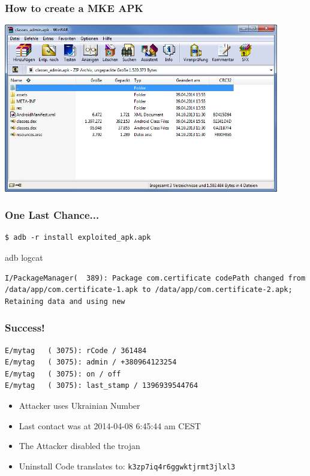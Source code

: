 \documentclass[12pt,a4paper]{beamer}
\begin{document}
\begin{frame}
\frametitle{How to create a MKE APK}
\centering
\includegraphics[width=0.9\textwidth]{images/after-mke.png}
\end{frame}

\begin{frame}[fragile]
\frametitle{One Last Chance...}

\begin{lstlisting}
$ adb -r install exploited_apk.apk
\end{lstlisting}

adb logcat
\begin{lstlisting}
I/PackageManager(  389): Package com.certificate codePath changed from /data/app/com.certificate-1.apk to /data/app/com.certificate-2.apk; Retaining data and using new
\end{lstlisting}

\end{frame}


\begin{frame}[fragile]
\frametitle{Success!}

\begin{lstlisting}
E/mytag   ( 3075): rCode / 361484
E/mytag   ( 3075): admin / +380964123254
E/mytag   ( 3075): on / off
E/mytag   ( 3075): last_stamp / 1396939544764
\end{lstlisting}

\begin{itemize}
	\item Attacker uses Ukrainian Number
	\item Last contact was at 2014-04-08 6:45:44 am CEST
	\item The Attacker disabled the trojan
	\item Uninstall Code translates to: \texttt{k3zp7iq4r6ggwktjrmt3jlxl3}
\end{itemize}

\end{frame}
\end{document}
